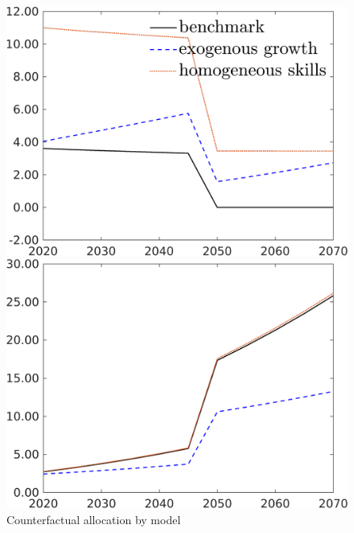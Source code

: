 \begin{figure}[h!!]
	\centering
	\caption{Counterfactual allocation by model }\label{fig:count_mod_allo}
	\begin{minipage}[]{0.32\textwidth}
		\includegraphics[width=1\textwidth]{../../codding_model/own_basedOnFried/optimalPol_190722_tidiedUp/figures/all_10Aout22/CountMod1_target_Emnet_regime3_spillover0_sep1_extern0_PV1_etaa0.79_lgd1.png}
	\end{minipage}
	\begin{minipage}[]{0.32\textwidth}
		\includegraphics[width=1\textwidth]{../../codding_model/own_basedOnFried/optimalPol_190722_tidiedUp/figures/all_10Aout22/CountMod1_target_GFF_regime3_spillover0_sep1_extern0_PV1_etaa0.79_lgd0.png}

\end{minipage}
\end{figure}
